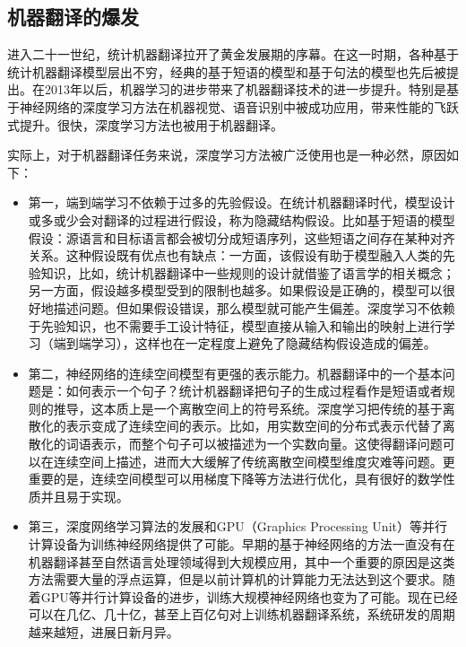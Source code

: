
\subsection{机器翻译的爆发}

\parinterval 进入二十一世纪，统计机器翻译拉开了黄金发展期的序幕。在这一时期，各种基于统计机器翻译模型层出不穷，经典的基于短语的模型和基于句法的模型也先后被提出。在2013年以后，机器学习的进步带来了机器翻译技术的进一步提升。特别是基于神经网络的深度学习方法在机器视觉、语音识别中被成功应用，带来性能的飞跃式提升。很快，深度学习方法也被用于机器翻译。

\parinterval 实际上，对于机器翻译任务来说，深度学习方法被广泛使用也是一种必然，原因如下：

\begin{itemize}
\vspace{0.5em}
\item 第一，端到端学习不依赖于过多的先验假设。在统计机器翻译时代，模型设计或多或少会对翻译的过程进行假设，称为隐藏结构假设。比如基于短语的模型假设：源语言和目标语言都会被切分成短语序列，这些短语之间存在某种对齐关系。这种假设既有优点也有缺点：一方面，该假设有助于模型融入人类的先验知识，比如，统计机器翻译中一些规则的设计就借鉴了语言学的相关概念；另一方面，假设越多模型受到的限制也越多。如果假设是正确的，模型可以很好地描述问题。但如果假设错误，那么模型就可能产生偏差。深度学习不依赖于先验知识，也不需要手工设计特征，模型直接从输入和输出的映射上进行学习（端到端学习），这样也在一定程度上避免了隐藏结构假设造成的偏差。
\vspace{0.5em}
\item 第二，神经网络的连续空间模型有更强的表示能力。机器翻译中的一个基本问题是：如何表示一个句子？统计机器翻译把句子的生成过程看作是短语或者规则的推导，这本质上是一个离散空间上的符号系统。深度学习把传统的基于离散化的表示变成了连续空间的表示。比如，用实数空间的分布式表示代替了离散化的词语表示，而整个句子可以被描述为一个实数向量。这使得翻译问题可以在连续空间上描述，进而大大缓解了传统离散空间模型维度灾难等问题。更重要的是，连续空间模型可以用梯度下降等方法进行优化，具有很好的数学性质并且易于实现。
\vspace{0.5em}
\item 第三，深度网络学习算法的发展和GPU（Graphics Processing Unit）等并行计算设备为训练神经网络提供了可能。早期的基于神经网络的方法一直没有在机器翻译甚至自然语言处理领域得到大规模应用，其中一个重要的原因是这类方法需要大量的浮点运算，但是以前计算机的计算能力无法达到这个要求。随着GPU等并行计算设备的进步，训练大规模神经网络也变为了可能。现在已经可以在几亿、几十亿，甚至上百亿句对上训练机器翻译系统，系统研发的周期越来越短，进展日新月异。
\vspace{0.5em}
\end{itemize}

